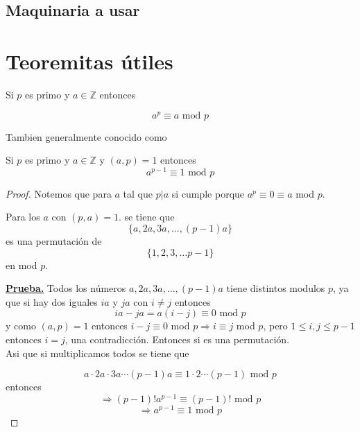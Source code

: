 \documentclass[11pt]{scrartcl}
\begin{document}
\subsection{Maquinaria a usar}






\newpage
\section{Teoremitas \'utiles}



\begin{theorem}
 Si $p$ es primo y $a\in \mathbb{Z}$ entonces 

$$a^p \equiv a \text{ mod } p$$
\end{theorem}
Tambien generalmente conocido como 

\begin{theorem*}
 Si $p$ es primo y $a\in \mathbb{Z}$ y $(a,p)=1$ entonces 
$$a^{p-1} \equiv 1 \text{ mod } p$$
\end{theorem*}

\begin{proof}
Notemos que para $a$ tal que $p|a$ si cumple porque $a^p\equiv 0 \equiv a$ mod $p$.

Para los $a$ con $(p,a)=1$. se tiene que 
$$\{a,2a,3a, \ldots, (p-1)a\}$$
es una permutación de 
$$\{1,2,3,\ldots p-1\}$$
en mod $p$. 

\underline{\textbf{Prueba.}} Todos los números $a,2a,3a,\ldots, (p-1)a$ tiene distintos modulos $p$, ya que si hay dos iguales $ia$ y $ja$ con $i\neq j$ entonces 
$$ia-ja= a(i-j) \equiv 0 \text{ mod } p$$
y como $(a,p)=1$ entonces $i-j \equiv 0$ mod $p \Rightarrow i\equiv j$ mod $p$, pero $1\leq i,j \leq p-1$ entonces $i=j$, una contradicción.
Entonces si es una permutación.  \\

Asi que si multiplicamos todos se tiene que 

$$a\cdot 2a\cdot 3a \cdots (p-1)a \equiv 1\cdot 2 \cdots (p-1) \text{ mod } p$$
entonces
$$ \Rightarrow(p-1)!a^{p-1}\equiv (p-1)! \text{ mod } p $$
$$ \Rightarrow a^{p-1}\equiv 1 \text{ mod }p$$
\end{proof}
\end{document}
